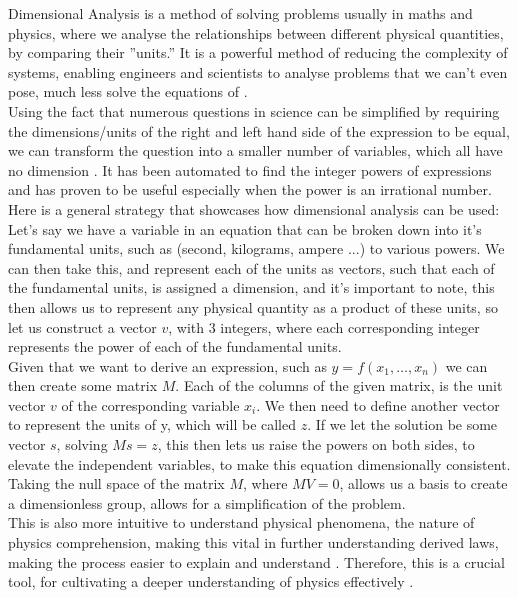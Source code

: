 \documentclass{article}
\begin{document}
Dimensional Analysis is a method of solving problems usually in maths and physics, where we analyse
the relationships between different physical quantities, by comparing their ”units.” It is a powerful
method of reducing the complexity of systems, enabling engineers and scientists to analyse problems
that we can’t even pose, much less solve the equations of \cite{Longo2021}.\\

Using the fact that numerous questions in science can be simplified by requiring the dimensions/units
of the right and left hand side of the expression to be equal, we can transform the question into
a smaller number of variables, which all have no dimension \cite{Blasiak2012}. It has been automated to find the integer powers of expressions and has proven to be useful especially when the power is an irrational number.\\

Here is a general strategy that showcases how dimensional analysis can be used:\\

Let's say we have a variable in an equation that can be broken down into it's fundamental units, such as (second, kilograms, ampere ...) to various powers. We can then take this, and represent each of the units as vectors, such that each of the fundamental units, is assigned a dimension, and it's important to note, this then allows us to represent any physical quantity as a product of these units, so let us construct a vector $v$, with $3$ integers, where each corresponding integer represents the power of each of the fundamental units.\\ 

Given that we want to derive an expression, such as $y = f(x_1, \dots, x_n)$  we can then create some matrix $M$. Each of the columns of the given matrix, is the unit vector $v$ of the corresponding variable $x_i$. We then need to define another vector to represent the units of y, which will be called $z$. If we let the solution be some vector $s$, solving $Ms = z$, this then lets us raise the powers on both sides, to elevate the independent variables, to make this equation dimensionally consistent.\\ 

Taking the null space of the matrix $M$, where $MV = 0$, allows us a basis to create a dimensionless group, allows for a simplification of the problem.\\

This is also more intuitive to understand physical phenomena, the nature of physics comprehension, making this vital in further understanding derived laws, making the process easier to explain and understand \cite{Taber2009}. Therefore, this is a crucial tool, for cultivating a deeper understanding of physics effectively \cite{Tenachi2023}. \\
\end{document}
